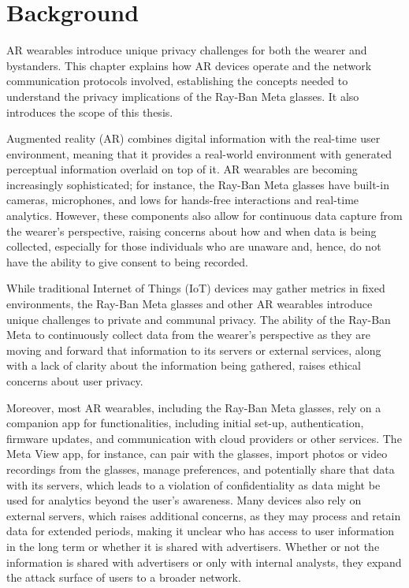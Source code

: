 \chapter{Background} 
\label{chap:Background}

AR wearables introduce unique privacy challenges for both the wearer and bystanders. This chapter explains how AR devices operate and the network communication protocols involved, establishing the concepts needed to understand the privacy implications of the Ray-Ban Meta glasses. It also introduces the scope of this thesis.

Augmented reality (AR) combines digital information with the real-time user environment, meaning that it provides a real-world environment with generated perceptual information overlaid on top of it. AR wearables are becoming increasingly sophisticated; for instance, the Ray-Ban Meta glasses have built-in cameras, microphones, and lows for hands-free interactions and real-time analytics. However, these components also allow for continuous data capture from the wearer's perspective, raising concerns about how and when data is being collected, especially for those individuals who are unaware and, hence, do not have the ability to give consent to being recorded.

While traditional Internet of Things (IoT) devices may gather metrics in fixed environments, the Ray-Ban Meta glasses and other AR wearables introduce unique challenges to private and communal privacy. The ability of the Ray-Ban Meta to continuously collect data from the wearer's perspective as they are moving and forward that information to its servers or external services, along with a lack of clarity about the information being gathered, raises ethical concerns about user privacy. 

Moreover, most AR wearables, including the Ray-Ban Meta glasses, rely on a companion app for functionalities, including initial set-up, authentication, firmware updates, and communication with cloud providers or other services. The Meta View app, for instance, can pair with the glasses, import photos or video recordings from the glasses, manage preferences, and potentially share that data with its servers, which leads to a violation of confidentiality as data might be used for analytics beyond the user's awareness. Many devices also rely on external servers, which raises additional concerns, as they may process and retain data for extended periods, making it unclear who has access to user information in the long term or whether it is shared with advertisers. Whether or not the information is shared with advertisers or only with internal analysts, they expand the attack surface of users to a broader network.  

